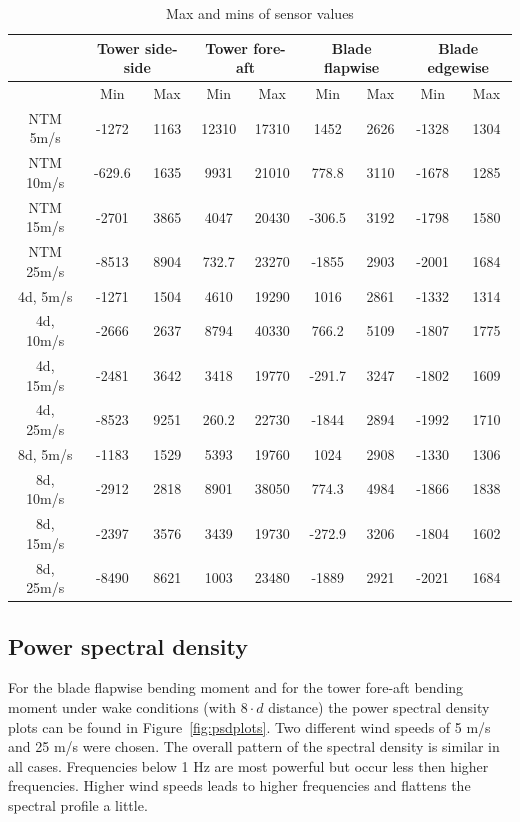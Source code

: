 \documentclass[10pt]{article}
\begin{document}
\begin{table}[H]
\centering
\begin{tabular}{ | c | c | c | c | c | c | c | c | c | }
	 \hline
	 & \multicolumn{2}{c|}{Tower side-side} &  \multicolumn{2}{c|}{Tower fore-aft} & \multicolumn{2}{c|}{Blade flapwise} & \multicolumn{2}{c|}{Blade edgewise } \\
	 \hline
	 & Min & Max & Min & Max & Min & Max & Min & Max \\
	 \hline
	 NTM 5m/s & -1272 & 1163 & 12310 & 17310 & 1452 & 2626 & -1328 & 1304 \\
	 \hline
	 NTM 10m/s & -629.6 & 1635 & 9931 & 21010 & 778.8 & 3110 & -1678 & 1285 \\
	 \hline
	 NTM 15m/s & -2701 & 3865 & 4047 & 20430 & -306.5 & 3192 & -1798 & 1580 \\ 
	 \hline
	 NTM 25m/s & -8513 & 8904 & 732.7 & 23270 & -1855 & 2903 & -2001 & 1684 \\ 
	 \hline
	 4d, 5m/s & -1271 & 1504 & 4610 & 19290 & 1016 & 2861 & -1332 & 1314 \\ 
	 \hline
	 4d, 10m/s & -2666 & 2637 & 8794 & 40330 & 766.2 & 5109 & -1807 & 1775 \\ 
	 \hline
	 4d, 15m/s & -2481 & 3642 & 3418 & 19770 & -291.7 & 3247 & -1802 & 1609 \\ 
	 \hline
	 4d, 25m/s & -8523 & 9251 & 260.2 & 22730 & -1844 & 2894 & -1992 & 1710 \\ 
	 \hline
	 8d, 5m/s & -1183 & 1529 & 5393 & 19760 & 1024 & 2908 & -1330 & 1306 \\ 
	 \hline
	 8d, 10m/s & -2912 & 2818 & 8901 & 38050 & 774.3 & 4984 & -1866 & 1838 \\ 
	 \hline
	 8d, 15m/s & -2397 & 3576 & 3439 & 19730 & -272.9 & 3206 & -1804 & 1602 \\ 
	 \hline
	 8d, 25m/s & -8490 & 8621 & 1003 & 23480 & -1889 & 2921 & -2021 & 1684 \\ 
	 \hline
\end{tabular}
\caption{Max and mins of sensor values}
\label{tab:statmaxmin}
\end{table}



\subsection{Power spectral density}
For the blade flapwise bending moment and for the tower fore-aft bending moment under wake conditions (with $8\cdot d$ distance) the power spectral density plots can be found in Figure~\ref{fig:psdplots}. Two different wind speeds of 5 m/s and 25 m/s were chosen.
The overall pattern of the spectral density is similar in all cases. Frequencies below 1 Hz are most powerful but occur less then higher frequencies. Higher wind speeds leads to higher frequencies and flattens the spectral profile a little.
\end{document}
